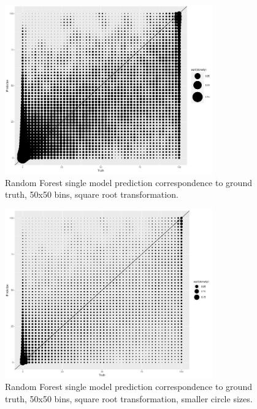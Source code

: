 \documentclass[a4paper,10pt]{article}
\begin{document}
\begin{figure}
    \includegraphics[width=0.8\textwidth]{article-figures/binplots/2019-04-12-rf-1m-uncor-point-n50s20sqrt}
    \caption{Random Forest single model prediction correspondence to ground truth, 50x50 bins, square root transformation.}
    \label{bin-rf-1m-uncor-n50sqrt}
\end{figure}
\begin{figure}
    \includegraphics[width=0.8\textwidth]{article-figures/binplots/2019-04-12-rf-1m-uncor-point-n50s10sqrt}
    \caption{Random Forest single model prediction correspondence to ground truth, 50x50 bins, square root transformation, smaller circle sizes.}
    \label{bin-rf-1m-uncor-n50sqrts10}
\end{figure}
\end{document}
